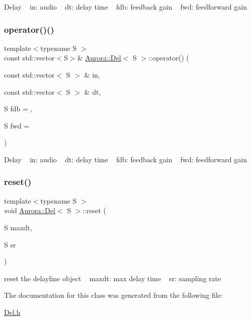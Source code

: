 Delay ~\newline
in\+: audio ~\newline
dt\+: delay time ~\newline
fdb\+: feedback gain ~\newline
fwd\+: feedforward gain \mbox{\label{class_aurora_1_1_del_a7b07356cf07e48791929e7c99c907650}} 
\subsubsection{\texorpdfstring{operator()()}{operator()()}\hspace{0.1cm}{\footnotesize\ttfamily [2/2]}}
{\footnotesize\ttfamily template$<$typename S $>$ \\
const std\+::vector$<$S$>$\& \hyperlink{class_aurora_1_1_del}{Aurora\+::\+Del}$<$ S $>$\+::operator() (\begin{DoxyParamCaption}\item[{const std\+::vector$<$ S $>$ \&}]{in,  }\item[{const std\+::vector$<$ S $>$ \&}]{dt,  }\item[{S}]{fdb = {},  }\item[{S}]{fwd = {} }\end{DoxyParamCaption})\hspace{0.3cm}{\ttfamily [inline]}}

Delay ~\newline
in\+: audio ~\newline
dt\+: delay time ~\newline
fdb\+: feedback gain ~\newline
fwd\+: feedforward gain \mbox{\label{class_aurora_1_1_del_a1d5f6aa043e47077b3c1654d884c77f1}} 
\subsubsection{\texorpdfstring{reset()}{reset()}}
{\footnotesize\ttfamily template$<$typename S $>$ \\
void \hyperlink{class_aurora_1_1_del}{Aurora\+::\+Del}$<$ S $>$\+::reset (\begin{DoxyParamCaption}\item[{S}]{maxdt,  }\item[{S}]{sr }\end{DoxyParamCaption})\hspace{0.3cm}{\ttfamily [inline]}}

reset the delayline object ~\newline
maxdt\+: max delay time ~\newline
sr\+: sampling rate 

The documentation for this class was generated from the following file\+:\begin{DoxyCompactItemize}
\item 
\hyperlink{_del_8h}{Del.\+h}\end{DoxyCompactItemize}
